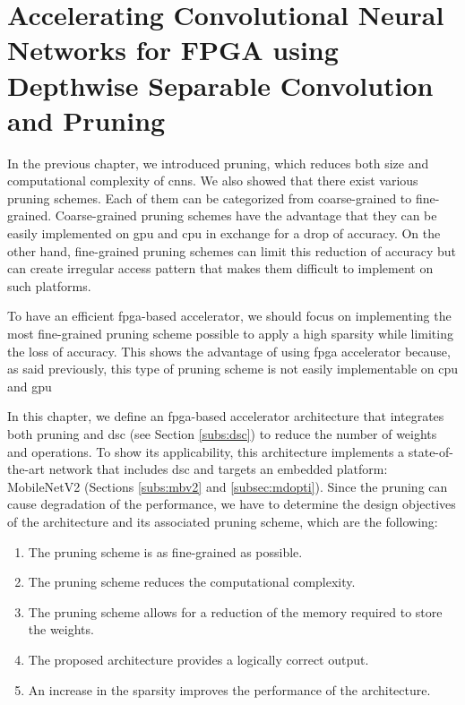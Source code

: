 \chapter{Accelerating Convolutional Neural Networks for FPGA using Depthwise Separable Convolution and Pruning} \label{chap:pratique}
%
%
In the previous chapter, we introduced pruning, which reduces both size and computational complexity of \acrshort{cnn}s. We also showed that there exist various pruning schemes. Each of them can be categorized from coarse-grained to fine-grained. Coarse-grained pruning schemes have the advantage that they can be easily implemented on \acrshort{gpu} and \acrshort{cpu} in exchange for a drop of accuracy. On the other hand, fine-grained pruning schemes can limit this reduction of accuracy but can create irregular access pattern that makes them difficult to implement on such platforms. 

To have an efficient \acrshort{fpga}-based accelerator, we should focus on implementing the most fine-grained pruning scheme possible to apply a high sparsity while limiting the loss of accuracy. This shows the advantage of using \acrshort{fpga} accelerator because, as said previously, this type of pruning scheme is not easily implementable on \acrshort{cpu} and \acrshort{gpu}

In this chapter, we define an \acrshort{fpga}-based accelerator architecture that integrates both pruning and \acrshort{dsc} (see Section \ref{subs:dsc}) to reduce the number of weights and operations. To show its applicability, this architecture implements a state-of-the-art network that includes \acrshort{dsc} and targets an embedded platform: MobileNetV2 (Sections \ref{subs:mbv2} and \ref{subsec:mdopti}). Since the pruning can cause degradation of the performance, we have to determine the design objectives of the architecture and its associated pruning scheme, which are the following:
%
\begin{enumerate}
    \item The pruning scheme is as fine-grained as possible.
    \item The pruning scheme reduces the computational complexity.
    \item The pruning scheme allows for a reduction of the memory required to store the weights.
    \item The proposed architecture provides a logically correct output.
    \item An increase in the sparsity improves the performance of the architecture.
\end{enumerate}

